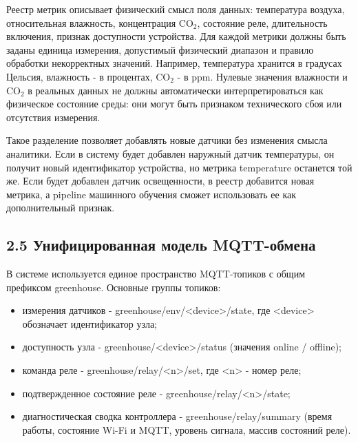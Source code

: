 \documentclass[a4paper,14pt]{extarticle}
\renewcommand{\texttt}[1]{\textnormal{#1}}
\providecommand{\tightlist}{%
  \setlength{\itemsep}{0pt}\setlength{\parskip}{0pt}}
\begin{document}
Реестр метрик описывает физический смысл поля данных: температура
воздуха, относительная влажность, концентрация CO\(_2\), состояние реле,
длительность включения, признак доступности устройства. Для каждой
метрики должны быть заданы единица измерения, допустимый физический
диапазон и правило обработки некорректных значений. Например,
температура хранится в градусах Цельсия, влажность - в процентах,
CO\(_2\) - в ppm. Нулевые значения влажности и CO\(_2\) в реальных
данных не должны автоматически интерпретироваться как физическое
состояние среды: они могут быть признаком технического сбоя или
отсутствия измерения.

Такое разделение позволяет добавлять новые датчики без изменения смысла
аналитики. Если в систему будет добавлен наружный датчик температуры, он
получит новый идентификатор устройства, но метрика \texttt{temperature}
останется той же. Если будет добавлен датчик освещенности, в реестр
добавится новая метрика, а pipeline машинного обучения сможет
использовать ее как дополнительный признак.

\hypertarget{ux443ux43dux438ux444ux438ux446ux438ux440ux43eux432ux430ux43dux43dux430ux44f-ux43cux43eux434ux435ux43bux44c-mqtt-ux43eux431ux43cux435ux43dux430}{%
\subsection{2.5 Унифицированная модель
MQTT-обмена}\label{ux443ux43dux438ux444ux438ux446ux438ux440ux43eux432ux430ux43dux43dux430ux44f-ux43cux43eux434ux435ux43bux44c-mqtt-ux43eux431ux43cux435ux43dux430}}

В системе используется единое пространство MQTT-топиков с общим
префиксом \texttt{greenhouse}. Основные группы топиков:

\begin{itemize}
\tightlist
\item
  измерения датчиков -
  \texttt{greenhouse/env/\textless{}device\textgreater{}/state}, где
  \texttt{\textless{}device\textgreater{}} обозначает идентификатор
  узла;
\item
  доступность узла -
  \texttt{greenhouse/\textless{}device\textgreater{}/status} (значения
  \texttt{online} / \texttt{offline});
\item
  команда реле -
  \texttt{greenhouse/relay/\textless{}n\textgreater{}/set}, где
  \texttt{\textless{}n\textgreater{}} - номер реле;
\item
  подтвержденное состояние реле -
  \texttt{greenhouse/relay/\textless{}n\textgreater{}/state};
\item
  диагностическая сводка контроллера - \texttt{greenhouse/relay/summary}
  (время работы, состояние Wi-Fi и MQTT, уровень сигнала, массив
  состояний реле).
\end{itemize}
\end{document}
